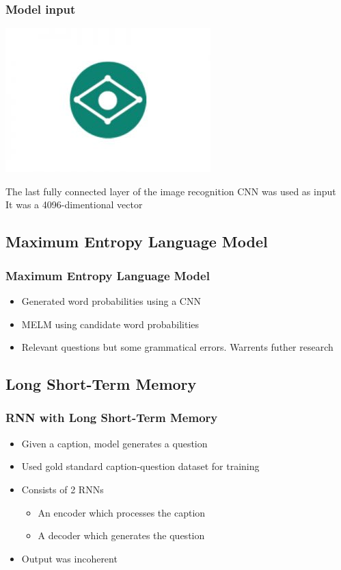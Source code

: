 \documentclass[xcolor=dvipsnames]{beamer}
\begin{document}
		\begin{frame}
			\frametitle{Model input}
			\begin{center}
				\includegraphics[scale=.3]{images/captionbot.jpg}
			\end{center}
			The last fully connected layer of the image recognition CNN was used as input\\
			\bigskip
			It was a 4096-dimentional vector
		\end{frame}
		\subsection{Maximum Entropy Language Model}
			
			\begin{frame}
				\frametitle{Maximum Entropy Language Model}
				\begin{itemize}
					\item<1-> Generated word probabilities using a CNN
					\item<2-> MELM using candidate word probabilities
					\item<3-> Relevant questions but some grammatical errors. Warrents futher research
				\end{itemize}
			\end{frame}
		
		\subsection{Long Short-Term Memory}
			
			\begin{frame}
				\frametitle{RNN with Long Short-Term Memory}
				\begin{itemize}
					\item<1-> Given a caption, model generates a question
					\item<2-> Used gold standard caption-question dataset for training
					\item<3-> Consists of 2 RNNs
						\begin{itemize}
							\item An encoder which processes the caption
							\item A decoder which generates the question
						\end{itemize}
					\item<4-> Output was incoherent
				\end{itemize}
			\end{frame}
		
\end{document}
